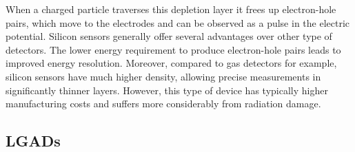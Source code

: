 
When a charged particle traverses this depletion layer it frees up electron-hole pairs, which move to the electrodes and can be observed as a pulse in the electric potential.
Silicon sensors generally offer several advantages over other type of detectors. The lower energy requirement to produce electron-hole pairs leads to improved energy resolution. Moreover, compared to gas detectors for example, silicon sensors have much higher density, allowing precise measurements in significantly thinner layers. However, this type of device has typically higher manufacturing costs and suffers more considerably from radiation damage.

\subsection{LGADs}


